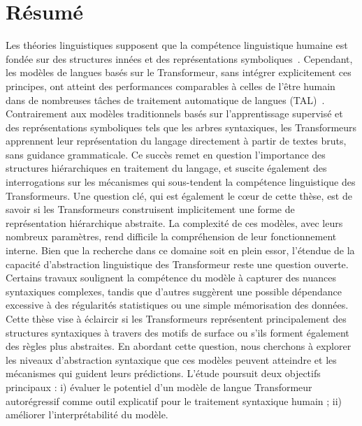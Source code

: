 \chapter*{Résumé}
Les théories linguistiques supposent que la compétence linguistique humaine est fondée sur des structures innées et des représentations symboliques~\citep{chomsky1965aspects,chomsky1986knowledge}. Cependant, les modèles de langues basés sur le Transformeur, sans intégrer explicitement ces principes, ont atteint des performances comparables à celles de l'être humain dans de nombreuses tâches de traitement automatique de langues (TAL)~\citep{lertvittayakumjorn2021explanation,bubeck2023sparks}. Contrairement aux modèles traditionnels basés sur l’apprentissage supervisé et des représentations symboliques tels que les arbres syntaxiques, les Transformeurs apprennent leur représentation du langage directement à partir de textes bruts, sans guidance grammaticale. Ce succès remet en question l'importance des structures hiérarchiques en traitement du langage, et suscite également des interrogations sur les mécanismes qui sous-tendent la compétence linguistique des Transformeurs. Une question clé, qui est également le cœur de cette thèse, est de savoir si les Transformeurs construisent implicitement une forme de représentation hiérarchique abstraite.  La complexité de ces modèles, avec leurs nombreux paramètres, rend difficile la compréhension de leur fonctionnement interne. Bien que la recherche dans ce domaine soit en plein essor, l’étendue de la capacité d’abstraction linguistique des Transformeur reste une question ouverte. Certains travaux soulignent la compétence du modèle à capturer des nuances syntaxiques complexes, tandis que d’autres suggèrent une possible dépendance excessive à des régularités statistiques ou une simple mémorisation des données. Cette thèse vise à éclaircir si les Transformeurs représentent principalement des structures syntaxiques à travers des motifs de surface ou s'ils forment également des règles plus abstraites. En abordant cette question, nous cherchons à explorer les niveaux d'abstraction syntaxique que ces modèles peuvent atteindre et les mécanismes qui guident leurs prédictions. L'étude poursuit deux objectifs principaux : i) évaluer le potentiel d'un modèle de langue Transformeur autorégressif comme outil explicatif pour le traitement syntaxique humain ; ii) améliorer l'interprétabilité du modèle.

